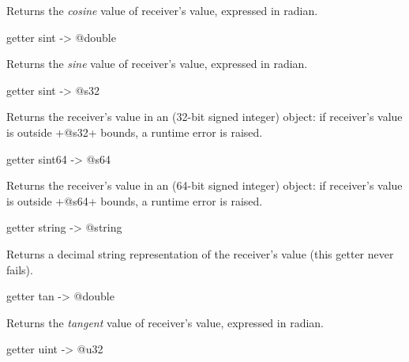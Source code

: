 Returns the \emph{cosine} value of receiver's value, expressed in radian.





\begin{galgas4}
getter sint -> @double
\end{galgas4}

Returns the \emph{sine} value of receiver's value, expressed in radian.





\begin{galgas4}
getter sint -> @s32
\end{galgas4}

Returns the receiver's value in an  (32-bit signed integer) object: if receiver's value is outside \ggsq+@s32+ bounds, a runtime error is raised.




\begin{galgas4}
getter sint64 -> @s64
\end{galgas4}

Returns the receiver's value in an  (64-bit signed integer) object: if receiver's value is outside \ggsq+@s64+ bounds, a runtime error is raised.





\begin{galgas4}
getter string -> @string
\end{galgas4}

Returns a decimal string representation of the receiver's value (this getter never fails).





\begin{galgas4}
getter tan -> @double
\end{galgas4}

Returns the \emph{tangent} value of receiver's value, expressed in radian.








\begin{galgas4}
getter uint -> @u32
\end{galgas4}

